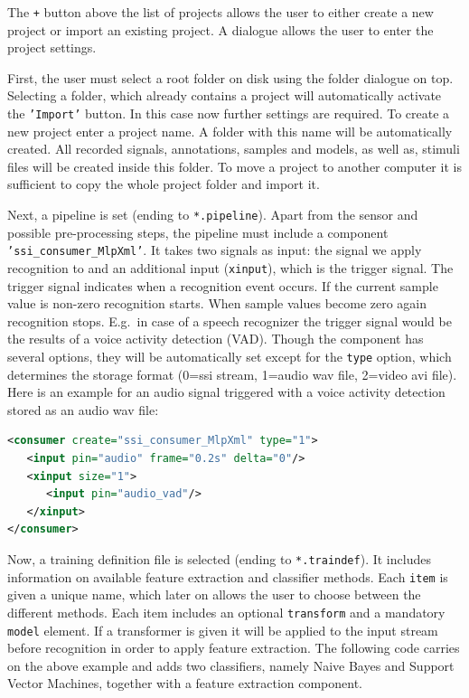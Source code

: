 The \texttt{+} button above the list of projects allows the user to either create a new project or import an existing project. A dialogue allows the user to enter the project settings.

First, the user must select a root folder on disk using the folder dialogue on top. Selecting a folder, which already contains a project will automatically activate the \texttt{'Import'} button. In this case now further settings are required. To create a new project enter a project name. A folder with this name will be automatically created. All recorded signals, annotations, samples and models, as well as, stimuli files will be created inside this folder. To move a project to another computer it is sufficient to copy the whole project folder and import it.

Next, a pipeline is set (ending to \texttt{*.pipeline}). Apart from the sensor and possible pre-processing steps, the pipeline must include a component \texttt{'ssi\_consumer\_MlpXml'}. It takes two signals as input: the signal we apply recognition to and an additional input (\texttt{xinput}), which is the trigger signal. The trigger signal indicates when a recognition event occurs. If the current sample value is non-zero recognition starts. When sample values become zero again recognition stops. E.g.\ in case of a speech recognizer the trigger signal would be the results of a voice activity detection (VAD). Though the component has several options, they will be automatically set except for the \texttt{type} option, which determines the storage format (0=ssi stream, 1=audio wav file, 2=video avi file). Here is an example for an audio signal triggered with a voice activity detection stored as an audio wav file:

\begin{lstlisting}[language=xml]
<consumer create="ssi_consumer_MlpXml" type="1">
   <input pin="audio" frame="0.2s" delta="0"/>
   <xinput size="1">
      <input pin="audio_vad"/>
   </xinput>
</consumer>
\end{lstlisting}

Now, a training definition file is selected (ending to \texttt{*.traindef}). It includes information on available feature extraction and classifier methods. Each \texttt{item} is given a unique name, which later on allows the user to choose between the different methods. Each item includes an optional \texttt{transform} and a mandatory \texttt{model} element. If a transformer is given it will be applied to the input stream before recognition in order to apply feature extraction. The following code carries on the above example and adds two classifiers, namely Naive Bayes and Support Vector Machines, together with a feature extraction component.

